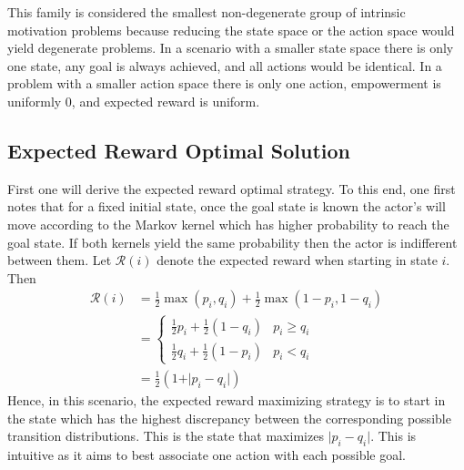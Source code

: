 \documentclass{article}
\newcommand{\Rr}{\mathcal{R}}
\begin{document}
This family is considered the smallest non-degenerate group of intrinsic motivation problems because reducing the state space or the action space would yield degenerate problems. In a scenario with a smaller state space there is only one state, any goal is always achieved, and all actions would be identical. In a problem with a smaller action space there is only one action, empowerment is uniformly $0$, and expected reward is uniform. 

\subsection{Expected Reward Optimal Solution}
First one will derive the expected reward optimal strategy. To this end, one first notes that for a fixed initial state, once the goal state is known the actor's will move according to the Markov kernel which has higher probability to reach the goal state. If both kernels yield the same probability then the actor is indifferent between them. Let $\Rr(i)$ denote the expected reward when starting in state $i$. Then
\begin{align*}
\Rr(i) 
	&= \frac{1}{2} \max(p_i,q_i) +\frac{1}{2} \max(1-p_i,1-q_i)\\
	&=\begin{cases}
		\frac{1}{2} p_i +\frac{1}{2} (1-q_i) & p_i\geq q_i\\
		\frac{1}{2} q_i +\frac{1}{2} (1-p_i) & p_i < q_i
		\end{cases}\\
	&=\frac{1}{2}(1+\vert p_i - q_i \vert) 	
\end{align*}
Hence, in this scenario, the expected reward maximizing strategy is to start in the state which has the highest discrepancy between the corresponding possible transition distributions. This is the state that maximizes $\vert p_i-q_i\vert$. This is intuitive as it aims to best associate one action with  each possible goal. 
\end{document}
